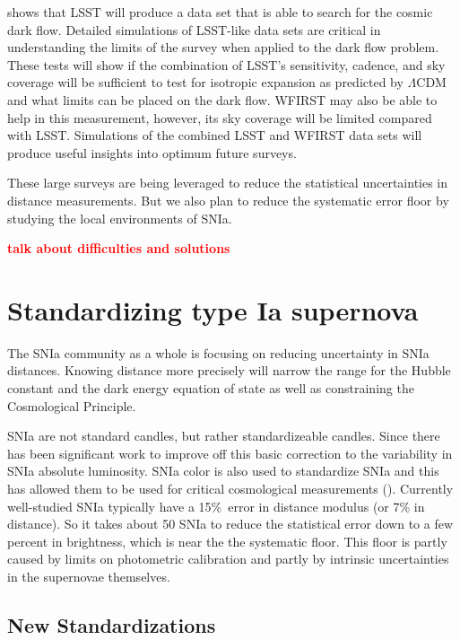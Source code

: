 \documentclass[apj, iop]{emulateapj}
\newcommand{\sn}{SNIa}
\newcommand{\todo}[1]{\textbf{\textcolor{red}{#1}}}
\begin{document}
\cite{Mathews16} shows that LSST will produce a data set that is able to search for
the cosmic dark flow. Detailed simulations of LSST-like data sets are critical in understanding
the limits of the survey when applied to the dark flow problem. These tests will show if the combination of
LSST's sensitivity, cadence, and sky coverage will be sufficient to test
for isotropic expansion as predicted by $\Lambda$CDM and what limits can be
placed on the dark flow.
WFIRST may also be able to help in this measurement, however, its sky
coverage will be limited compared with LSST.
Simulations of the combined LSST and WFIRST data sets will produce useful insights into
optimum future surveys.

These large surveys are being leveraged to reduce the statistical uncertainties in distance
measurements. But we also plan to reduce the systematic error floor by studying the
local environments of SNIa.

\todo{talk about difficulties and solutions}

\section{Standardizing type Ia
supernova}\label{standardizing-type-ia-supernova}

The \sn{} community as a whole is focusing on reducing uncertainty in SNIa
distances. Knowing distance more precisely will narrow the range for the Hubble
constant and the dark energy equation of state as well as
constraining the Cosmological Principle.

\sn{} are not standard candles, but rather standardizeable candles. Since
\cite{Phillips93} there has been significant work to improve off this basic correction to the
variability in \sn{} absolute luminosity. \sn{} color is also used to standardize \sn{} and
this has allowed them to be used for critical cosmological measurements
(\citep{Riess98, Perlmutter99}). Currently well-studied \sn{} typically have a
15\%\ error in distance modulus (or 7\% in distance). So it takes about 50 SNIa
to reduce the statistical error down to a few percent in brightness, which is near the 
the systematic floor. This floor is partly caused by limits on photometric calibration and
partly by intrinsic uncertainties in the supernovae themselves.

\subsection{New Standardizations}\label{new-standardizations}
\end{document}
